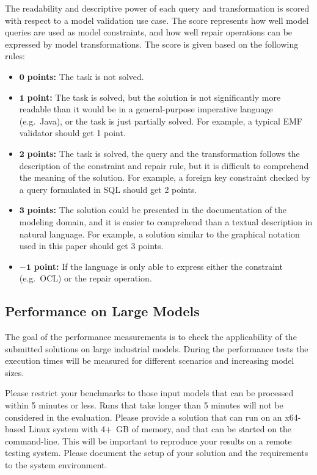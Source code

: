 \documentclass[submission,copyright,creativecommons]{eptcs}
\begin{document}
The readability and descriptive power of each query and transformation is scored with respect to a model validation use case. The score represents how well model queries are used as model constraints, and how well repair operations can be expressed by model transformations. The score is given based on the following rules:
\begin{itemize}
	\item $\mathbf{0}$   \textbf{points:} The task is not solved.
	\item $\mathbf{1}$   \textbf{point:} The task is solved, but the solution is not significantly more readable than it would be in a general-purpose imperative language (e.g.\ Java), or the task is just partially solved. For example, a typical EMF validator should get 1 point.
	\item $\mathbf{2}$   \textbf{points:} The task is solved, the query and the transformation follows the description of the constraint and repair rule, but it is difficult to comprehend the meaning of the solution. For example, a foreign key constraint checked by a query formulated in SQL should get 2 points.
	\item $\mathbf{3}$   \textbf{points:} The solution could be presented in the documentation of the modeling domain, and it is easier to comprehend than a textual description in natural language. For example, a solution similar to the graphical notation used in this paper should get 3 points.
	\item $\mathbf{-1}$  \textbf{point:} If the language is only able to express either the constraint (e.g.\ OCL) or the repair operation.
\end{itemize}

\noindent{}

\subsection{Performance on Large Models}
The goal of the performance measurements is to check the applicability of the submitted solutions on large industrial models. During the performance tests the execution times will be measured for different scenarios and increasing model sizes.

Please restrict your benchmarks to those input models that can be processed within 5 minutes or less. Runs that take longer than 5 minutes will not be considered in the evaluation. Please provide a solution that can run on an x64-based Linux system with 4+~GB of memory, and that can be started on the command-line. This will be important to reproduce your results on a remote testing system. Please document the setup of your solution and the requirements to the system environment.
\end{document}
